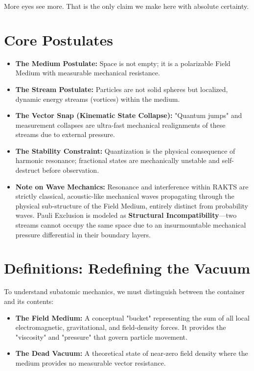 \documentclass[reprint,amsmath,amssymb,aps,prd,twocolumn]{revtex4-2}
\begin{document}
More eyes see more. That is the only claim we make here with absolute certainty.

\section{Core Postulates}
\begin{itemize}
    \item \textbf{The Medium Postulate:} Space is not empty; it is a polarizable Field Medium with measurable mechanical resistance.
    \item \textbf{The Stream Postulate:} Particles are not solid spheres but localized, dynamic energy streams (vortices) within the medium.
    \item \textbf{The Vector Snap (Kinematic State Collapse):} "Quantum jumps" and measurement collapses are ultra-fast mechanical realignments of these streams due to external pressure.
    \item \textbf{The Stability Constraint:} Quantization is the physical consequence of harmonic resonance; fractional states are mechanically unstable and self-destruct before observation.
    \item \textbf{Note on Wave Mechanics:} Resonance and interference within RAKTS are strictly classical, acoustic-like mechanical waves propagating through the physical sub-structure of the Field Medium, entirely distinct from probability waves. Pauli Exclusion is modeled as \textbf{Structural Incompatibility}—two streams cannot occupy the same space due to an insurmountable mechanical pressure differential in their boundary layers.
\end{itemize}

\section{Definitions: Redefining the Vacuum}
To understand subatomic mechanics, we must distinguish between the container and its contents:

\begin{itemize}
    \item \textbf{The Field Medium:} A conceptual "bucket" representing the sum of all local electromagnetic, gravitational, and field-density forces. It provides the "viscosity" and "pressure" that govern particle movement.
    \item \textbf{The Dead Vacuum:} A theoretical state of near-zero field density where the medium provides no measurable vector resistance.
\end{itemize}
\end{document}
